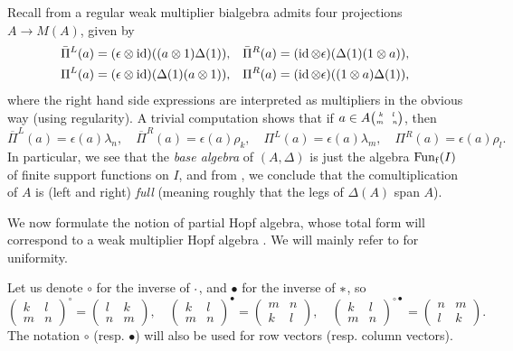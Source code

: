 
\begin{Rem}\label{RemFull}
Recall from \cite[Section 3]{Boh1} a regular weak multiplier bialgebra admits four projections $A\rightarrow M(A)$, given by \begin{align*} \bar{\Pi}^L(a) = (\epsilon\otimes \operatorname{id})((a\otimes 1)\Delta(1)),\quad &  \bar{\Pi}^R(a) = (\operatorname{id}\otimes \epsilon)(\Delta(1)(1\otimes a)),\\ \Pi^L(a)  = (\epsilon\otimes \operatorname{id})(\Delta(1)(a\otimes 1)),\quad& \Pi^R(a) = (\operatorname{id}\otimes\epsilon)((1\otimes a)\Delta(1)),\end{align*} where the right hand side expressions are interpreted as multipliers in the obvious way (using regularity). A trivial computation shows that if $a\in A{{\tiny \begin{pmatrix} k \quad l \\ m \quad n\end{pmatrix}}}$, then \[ \overline{\Pi}^L(a) =\epsilon(a)\lambda_n,\quad \overline{\Pi}^R(a) =\epsilon(a)\rho_k,\quad \Pi^L(a) =\epsilon(a)\lambda_m,\quad \Pi^R(a) = \epsilon(a) \rho_l.\] In particular, we see that the \emph{base algebra} of $(A,\Delta)$ is just the algebra $\mathrm{Fun}_{\operatorname{\mathrm{f}}}(I)$ of finite support functions on $I$, and from \cite[Theorem 3.13]{Boh1}, we conclude that the comultiplication of $A$ is (left and right) \emph{full} (meaning roughly that the legs of $\Delta(A)$ span $A$).
\end{Rem}

We now formulate the notion of partial Hopf algebra, whose total form will correspond to a weak multiplier Hopf algebra \cite{Boh1,VDW2,VDW1}. We will mainly refer to \cite{Boh1} for uniformity.%

 Let us denote $\circ$ for the inverse of $\cdot$, and $\bullet$ for the inverse of $*$, so \[\begin{pmatrix} k & l \\ m & n \end{pmatrix}^{\circ} = \begin{pmatrix} l & k \\ n & m \end{pmatrix},\quad \begin{pmatrix} k & l \\ m & n \end{pmatrix}^{\bullet} = \begin{pmatrix} m & n \\ k & l \end{pmatrix},\quad \begin{pmatrix} k & l \\ m & n \end{pmatrix}^{\circ \bullet} = \begin{pmatrix} n & m \\ l & k \end{pmatrix}.\] The notation $\circ$ (resp. $\bullet$) will also be used for row vectors (resp. column vectors).

